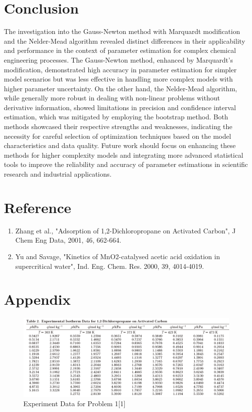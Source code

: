 \documentclass[12pt]{article} %
\begin{document}
\section{Conclusion}
The investigation into the Gauss-Newton method with Marquardt modification and the Nelder-Mead algorithm revealed distinct differences in their applicability and performance in the context of parameter estimation for complex chemical engineering processes. The Gauss-Newton method, enhanced by Marquardt’s modification, demonstrated high accuracy in parameter estimation for simpler model scenarios but was less effective in handling more complex models with higher parameter uncertainty. On the other hand, the Nelder-Mead algorithm, while generally more robust in dealing with non-linear problems without derivative information, showed limitations in precision and confidence interval estimation, which was mitigated by employing the bootstrap method. Both methods showcased their respective strengths and weaknesses, indicating the necessity for careful selection of optimization techniques based on the model characteristics and data quality. Future work should focus on enhancing these methods for higher complexity models and integrating more advanced statistical tools to improve the reliability and accuracy of parameter estimations in scientific research and industrial applications.
\section{Reference}
\begin{enumerate}
    \item Zhang et al., "Adsorption of 1,2-Dichloropropane on Activated Carbon", J Chem Eng Data, 2001, 46, 662-664.
    \item Yu and Savage, "Kinetics of MnO2-catalysed acetic acid oxidation in supercritical water", Ind. Eng. Chem. Res. 2000, 39, 4014-4019.
\end{enumerate}
\section{Appendix}
\begin{figure}[ht]
    \centering
    \includegraphics[width=1\textwidth]{Q1_data.png}
    \caption{Experiment Data for Problem 1[1]}
\end{figure}
\end{document}
